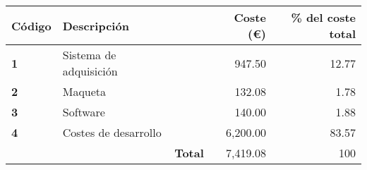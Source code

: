 \begin{center}
    \begin{tabular}{ | l || p{9cm}  l | r | r |}
    \hline
    \textbf{Código} & \multicolumn{1}{l}{\textbf{Descripción}} &  & \textbf{Coste (\euro)}  & \textbf{\% del coste total} \\ \hline \hline
    
    \textbf{1} & Sistema de adquisición &  & 947.50 & 12.77 \\ \hline
    
	\textbf{2} & Maqueta &  & 132.08& 1.78 \\ \hline

	\textbf{3} & Software &  & 140.00 & 1.88 \\ \hline 

    \textbf{4} & Costes de desarrollo &  & 6,200.00 & 83.57\\ \hline 
	
	\multicolumn{1}{r}{} & & \textbf{Total} & 7,419.08 & 100\\  \cline{4-5}
    	
	
\end{tabular}
\end{center}